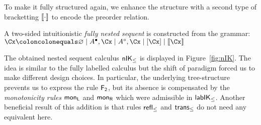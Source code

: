 \documentclass[twoside]{aiml20}
\begin{document}
To make it fully structured again, we enhance the structure with a second type of bracketting $\bBR{\cdot}$ to encode the preorder relation.
%

\begin{definition}
	A two-sided intuitionistic \emph{fully nested sequent} is constructed from the grammar:
	$\Cx \coloncolonequals \varnothing \mid \lf A, \Cx \mid \rt A, \Cx \mid \BR{\Cx} \mid \bBR{\Cx}$
\end{definition}

The obtained nested sequent calculus $\mathsf{n}\mathsf{IK}_{\le}$ is displayed in Figure~\ref{fig:nIK}.
%
The idea is similar to the fully labelled calculus but the shift of paradigm forced us to make different design choices.
%
In particular, the underlying tree-structure prevents us to express the rule $\mathsf{F_2}$, but its absence is compensated by the \emph{monotonicity rules} $\mathsf{mon}_{\mathsf{L}}$ and $\mathsf{mon}_{\mathsf{R}}$ which were admissible in $\mathsf{lab}\mathsf{IK}_{\le}$.
%
Another beneficial result of this addition is that rules $\mathsf{refl_\le}$ and $\mathsf{trans_\le}$ do not need any equivalent here.


%
%
\end{document}
